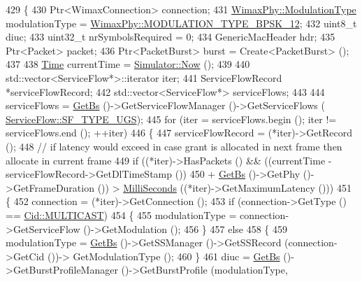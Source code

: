 \begin{DoxyCode}
429 \{
430   Ptr<WimaxConnection> connection;
431   \hyperlink{classns3_1_1WimaxPhy_a044c5d8a48ca992c39c2a946f6e755fa}{WimaxPhy::ModulationType} modulationType = 
      \hyperlink{classns3_1_1WimaxPhy_a044c5d8a48ca992c39c2a946f6e755faaef0b78541d9b66d4e85780131e665028}{WimaxPhy::MODULATION\_TYPE\_BPSK\_12};
432   uint8\_t diuc;
433   uint32\_t nrSymbolsRequired = 0;
434   GenericMacHeader hdr;
435   Ptr<Packet> packet;
436   Ptr<PacketBurst> burst = Create<PacketBurst> ();
437 
438   \hyperlink{namespacens3_1_1TracedValueCallback_a7ffd3e7c142ffe7c8a1d2db9b8de38ec}{Time} currentTime = \hyperlink{classns3_1_1Simulator_ac3178fa975b419f7875e7105be122800}{Simulator::Now} ();
439 
440   std::vector<ServiceFlow*>::iterator iter;
441   ServiceFlowRecord *serviceFlowRecord;
442   std::vector<ServiceFlow*> serviceFlows;
443 
444   serviceFlows = \hyperlink{classns3_1_1BSScheduler_a8b09065ac8f74cb35446af55128e41c7}{GetBs} ()->GetServiceFlowManager ()->GetServiceFlows (
      \hyperlink{classns3_1_1ServiceFlow_a7990ba10be1e098328fd1e6382a26235a969e0b62fa12fef1dbb23913744ed594}{ServiceFlow::SF\_TYPE\_UGS});
445   \textcolor{keywordflow}{for} (iter = serviceFlows.begin (); iter != serviceFlows.end (); ++iter)
446     \{
447       serviceFlowRecord = (*iter)->GetRecord ();
448       \textcolor{comment}{// if latency would exceed in case grant is allocated in next frame then allocate in current frame}
449       \textcolor{keywordflow}{if} ((*iter)->HasPackets () && ((currentTime - serviceFlowRecord->GetDlTimeStamp ())
450                                      + \hyperlink{classns3_1_1BSScheduler_a8b09065ac8f74cb35446af55128e41c7}{GetBs} ()->GetPhy ()->GetFrameDuration ()) > 
      \hyperlink{group__timecivil_gaf26127cf4571146b83a92ee18679c7a9}{MilliSeconds} ((*iter)->GetMaximumLatency ()))
451         \{
452           connection = (*iter)->GetConnection ();
453           \textcolor{keywordflow}{if} (connection->GetType () == \hyperlink{classns3_1_1Cid_a10b8f92080ca5790e65a0bfa2f557e0aa4d3bf31623ed09b9755d86bdfa345a4a}{Cid::MULTICAST})
454             \{
455               modulationType = connection->GetServiceFlow ()->GetModulation ();
456             \}
457           \textcolor{keywordflow}{else}
458             \{
459               modulationType = \hyperlink{classns3_1_1BSScheduler_a8b09065ac8f74cb35446af55128e41c7}{GetBs} ()->GetSSManager ()->GetSSRecord (connection->GetCid ())->
      GetModulationType ();
460             \}
461           diuc = \hyperlink{classns3_1_1BSScheduler_a8b09065ac8f74cb35446af55128e41c7}{GetBs} ()->GetBurstProfileManager ()->GetBurstProfile (modulationType,

\end{DoxyCode}
